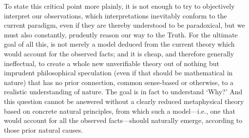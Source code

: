 To state this critical point more plainly, it is not enough to try to objectively interpret our observations, which interpretations inevitably conform to the current paradigm, even if they are thereby understood to be paradoxical, but we must also constantly, prudently reason our way to the Truth. For the ultimate goal of all this, is not merely a model deduced from the current theory which would account for the observed facts; and it is cheap, and therefore generally ineffectual, to create a whole new unverifiable theory out of nothing but imprudent philosophical speculation (even if that should be mathematical in nature) that has no prior connection, common sense-based or otherwise, to a realistic understanding of nature. The goal is in fact to understand `Why?' And this question cannot be answered without a clearly reduced metaphysical theory based on concrete natural principles, from which such a model---i.e., one that would account for all the observed facts---should naturally emerge, according to those prior natural causes. 

